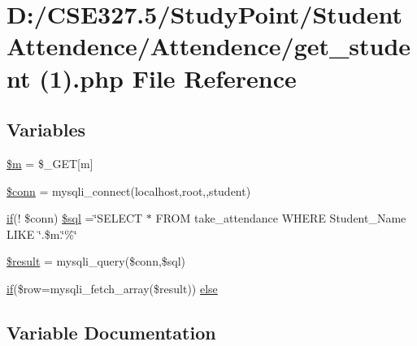 \hypertarget{get__student_01_071_08_8php}{}\section{D\+:/\+C\+S\+E327.5/\+Study\+Point/\+Student Attendence/\+Attendence/get\+\_\+student (1).php File Reference}
\label{get__student_01_071_08_8php}
\subsection*{Variables}
\begin{DoxyCompactItemize}
\item 
\mbox{\hyperlink{get__student_01_071_08_8php_a0c788ee1ad50aa3f1b2c28bb7a00db49}{\$m}} = \$\+\_\+\+G\+ET\mbox{[}\textquotesingle{}m\textquotesingle{}\mbox{]}
\item 
\mbox{\hyperlink{get__student_01_071_08_8php_aa8a5a87b9c1a6a0819b88447cbe41877}{\$conn}} = mysqli\+\_\+connect(\textquotesingle{}localhost\textquotesingle{},\textquotesingle{}root\textquotesingle{},\textquotesingle{}\textquotesingle{},\textquotesingle{}student\textquotesingle{})
\item 
\mbox{\hyperlink{connection_01_071_08_8php_a43dd02ab50145011973ca5e9cd22acd8}{if}}(! \$conn) \mbox{\hyperlink{get__student_01_071_08_8php_a3fa169ca8a41bd92d1d62f21e47f3555}{\$sql}} =\char`\"{}S\+E\+L\+E\+CT $\ast$ F\+R\+OM take\+\_\+attendance W\+H\+E\+RE Student\+\_\+\+Name L\+I\+KE \textquotesingle{}\char`\"{}.\$m.\char`\"{}\%\textquotesingle{}\char`\"{}
\item 
\mbox{\hyperlink{get__student_01_071_08_8php_a112ef069ddc0454086e3d1e6d8d55d07}{\$result}} = mysqli\+\_\+query(\$conn,\$sql)
\item 
\mbox{\hyperlink{connection_01_071_08_8php_a43dd02ab50145011973ca5e9cd22acd8}{if}}(\$row=mysqli\+\_\+fetch\+\_\+array(\$result)) \mbox{\hyperlink{get__student_01_071_08_8php_a6b1956a906df0e099feab558764facea}{else}}
\end{DoxyCompactItemize}


\subsection{Variable Documentation}
\mbox{\label{get__student_01_071_08_8php_aa8a5a87b9c1a6a0819b88447cbe41877}} 
